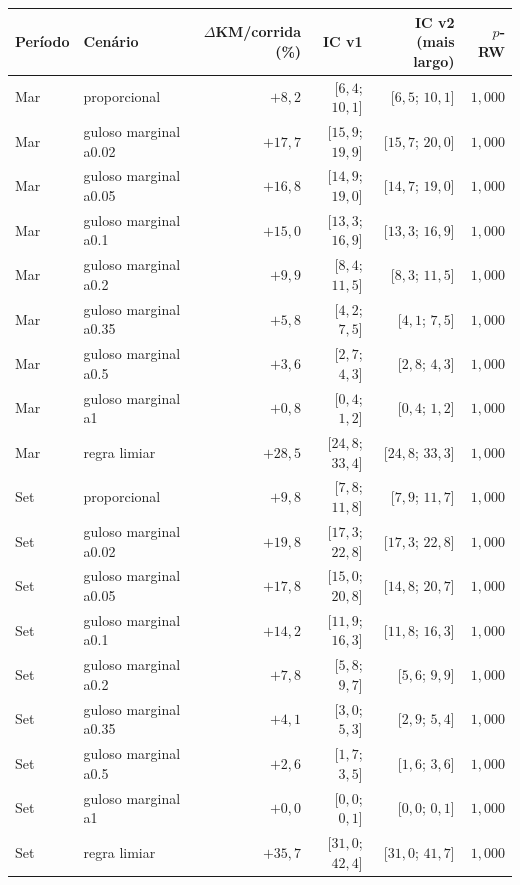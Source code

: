 \begin{tabular}{llrrrr}
\hline
Período & Cenário & $\Delta$KM/corrida (\%) & IC v1 & IC v2 (mais largo) & $p$-RW \\
\hline
Mar & proporcional & $+8{,}2$ & [$6{,}4$; $10{,}1$] & [$6{,}5$; $10{,}1$] & $1{,}000$ \\
Mar & guloso marginal a0.02 & $+17{,}7$ & [$15{,}9$; $19{,}9$] & [$15{,}7$; $20{,}0$] & $1{,}000$ \\
Mar & guloso marginal a0.05 & $+16{,}8$ & [$14{,}9$; $19{,}0$] & [$14{,}7$; $19{,}0$] & $1{,}000$ \\
Mar & guloso marginal a0.1 & $+15{,}0$ & [$13{,}3$; $16{,}9$] & [$13{,}3$; $16{,}9$] & $1{,}000$ \\
Mar & guloso marginal a0.2 & $+9{,}9$ & [$8{,}4$; $11{,}5$] & [$8{,}3$; $11{,}5$] & $1{,}000$ \\
Mar & guloso marginal a0.35 & $+5{,}8$ & [$4{,}2$; $7{,}5$] & [$4{,}1$; $7{,}5$] & $1{,}000$ \\
Mar & guloso marginal a0.5 & $+3{,}6$ & [$2{,}7$; $4{,}3$] & [$2{,}8$; $4{,}3$] & $1{,}000$ \\
Mar & guloso marginal a1 & $+0{,}8$ & [$0{,}4$; $1{,}2$] & [$0{,}4$; $1{,}2$] & $1{,}000$ \\
Mar & regra limiar & $+28{,}5$ & [$24{,}8$; $33{,}4$] & [$24{,}8$; $33{,}3$] & $1{,}000$ \\
Set & proporcional & $+9{,}8$ & [$7{,}8$; $11{,}8$] & [$7{,}9$; $11{,}7$] & $1{,}000$ \\
Set & guloso marginal a0.02 & $+19{,}8$ & [$17{,}3$; $22{,}8$] & [$17{,}3$; $22{,}8$] & $1{,}000$ \\
Set & guloso marginal a0.05 & $+17{,}8$ & [$15{,}0$; $20{,}8$] & [$14{,}8$; $20{,}7$] & $1{,}000$ \\
Set & guloso marginal a0.1 & $+14{,}2$ & [$11{,}9$; $16{,}3$] & [$11{,}8$; $16{,}3$] & $1{,}000$ \\
Set & guloso marginal a0.2 & $+7{,}8$ & [$5{,}8$; $9{,}7$] & [$5{,}6$; $9{,}9$] & $1{,}000$ \\
Set & guloso marginal a0.35 & $+4{,}1$ & [$3{,}0$; $5{,}3$] & [$2{,}9$; $5{,}4$] & $1{,}000$ \\
Set & guloso marginal a0.5 & $+2{,}6$ & [$1{,}7$; $3{,}5$] & [$1{,}6$; $3{,}6$] & $1{,}000$ \\
Set & guloso marginal a1 & $+0{,}0$ & [$0{,}0$; $0{,}1$] & [$0{,}0$; $0{,}1$] & $1{,}000$ \\
Set & regra limiar & $+35{,}7$ & [$31{,}0$; $42{,}4$] & [$31{,}0$; $41{,}7$] & $1{,}000$ \\
\hline
\end{tabular}

